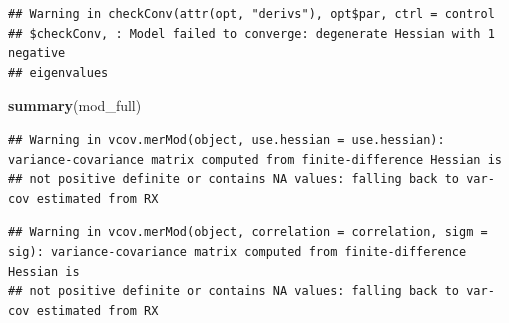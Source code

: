 \documentclass[]{article}
\newenvironment{Shaded}{\begin{snugshade}}{\end{snugshade}}
\newcommand{\KeywordTok}[1]{\textcolor[rgb]{0.13,0.29,0.53}{\textbf{#1}}}
\newcommand{\NormalTok}[1]{#1}
\begin{document}
\begin{verbatim}
## Warning in checkConv(attr(opt, "derivs"), opt$par, ctrl = control
## $checkConv, : Model failed to converge: degenerate Hessian with 1 negative
## eigenvalues
\end{verbatim}

\begin{Shaded}
\begin{Highlighting}[]
\KeywordTok{summary}\NormalTok{(mod_full)}
\end{Highlighting}
\end{Shaded}

\begin{verbatim}
## Warning in vcov.merMod(object, use.hessian = use.hessian): variance-covariance matrix computed from finite-difference Hessian is
## not positive definite or contains NA values: falling back to var-cov estimated from RX
\end{verbatim}

\begin{verbatim}
## Warning in vcov.merMod(object, correlation = correlation, sigm = sig): variance-covariance matrix computed from finite-difference Hessian is
## not positive definite or contains NA values: falling back to var-cov estimated from RX
\end{verbatim}
\end{document}
